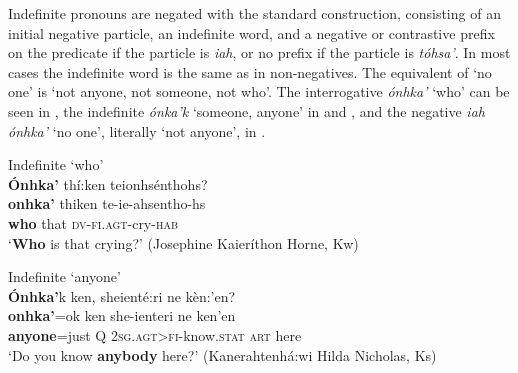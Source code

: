 \documentclass[output=paper,colorlinks,citecolor=brown]{langscibook}
\begin{document}
Indefinite pronouns are negated with the standard construction, consisting of an initial negative particle, an indefinite word, and a negative or contrastive prefix on the predicate if the particle is \textit{iah}, or no prefix if the particle is \textit{tóhsa’}. In most cases the indefinite word is the same as in non-negatives. The equivalent of ‘no one’ is ‘not anyone, not someone, not who’. The interrogative \textit{ónhka’} ‘who’ can be seen in , the indefinite \textit{ónka’k} ‘someone, anyone’ in  and , and the negative \textit{iah ónhka’} ‘no one’, literally ‘not anyone’, in .


\ea\label{ex:moh:68}Indefinite ‘who’\\
    \glll \textbf{Ónhka’} thí:ken teionhsénthohs? \\ 
         \textbf{onhka’} thiken te-ie-ahsentho-hs \\
         \textbf{who} that \textsc{dv-fi.agt}-cry-\textsc{hab}\\
    \glt ‘\textbf{Who} is that crying?’ (Josephine Kaieríthon Horne, Kw)
\z  

{\ea\label{ex:moh:69}Indefinite ‘anyone’\\
    \glll \textbf{Ónhka’}k ken, sheienté:ri ne kèn:’en?\\
         \textbf{onhka’}=ok ken she-ienteri ne ken’en\\
         \textbf{anyone}=just Q \textsc{2sg.agt>fi}-know.\textsc{stat} \textsc{art} here\\
    \glt ‘Do you know \textbf{anybody} here?’ (Kanerahtenhá:wi Hilda Nicholas, Ks)
\z}
\end{document}
